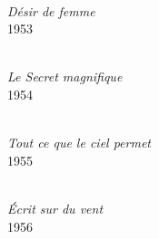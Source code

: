\vspace*{\fill}

\noindent
\begin{minipage}[t]{0.460\textwidth}
  \begin{flushleft}
    \\[0.3em]
    {\figcaptionname\itshape Désir de femme}\\[-6pt]
    {\figcaptiondetail\textup{1953}}
  \end{flushleft}
\end{minipage}
\hfill
\begin{minipage}[t]{0.470\textwidth}
  \begin{flushright}
    \\[0.3em]
    {\figcaptionname\itshape Le Secret magnifique}\\[-6pt]
    {\figcaptiondetail\textup{1954}}
  \end{flushright}
\end{minipage}

\vspace{\baselineskip}

\noindent
\begin{minipage}[t]{0.465\textwidth}
  \begin{flushleft}
    \\[0.3em]
    {\figcaptionname\itshape Tout ce que le ciel permet}\\[-6pt]
    {\figcaptiondetail\textup{1955}}
  \end{flushleft}
\end{minipage}
\hfill
\begin{minipage}[t]{0.465\textwidth}
  \begin{flushright}
    \\[0.3em]
    {\figcaptionname\itshape Écrit sur du vent}\\[-6pt]
    {\figcaptiondetail\textup{1956}}
  \end{flushright}
\end{minipage}

\vspace*{\fill}
